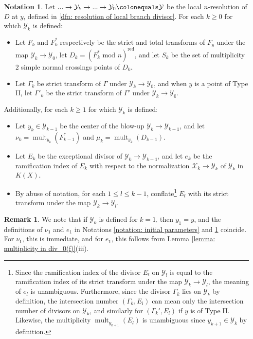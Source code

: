 \documentclass[12pt]{amsart}
\numberwithin{equation}{section}
\theoremstyle{definition}
\newtheorem{remark}[equation]{Remark}
\newtheorem{notation}[equation]{Notation}
\newcommand{\X}{\mathcal{X}}
\newcommand{\Y}{\mathcal{Y}}
\newcommand{\tx}[1]{\text{#1}}
\DeclareMathOperator{\mult}{mult}
\begin{document}
\begin{notation}\label{notation: multiplicity 2 point}
    Let $...\to\Y_k\to...\to\Y_0\colonequals\Y$ be the local $n$-resolution of $D$ at $y$, defined in \ref{dfn: resolution of local branch divisor}. For each $k\geq 0$ for which $\Y_k$ is defined:
    \begin{itemize}
        \item Let $F_k$ and $F_k^*$ respectively be the strict and total transforms of $F_y$ under the map $\Y_k\to\Y_0$, let $D_k=(F_k^*\tx{ mod }n)^\tx{red}$, and let $S_k$ be the set of multiplicity $2$ simple normal crossings points of $D_k$.
        \item Let $\Gamma_k$ be strict transform of $\Gamma$ under $\Y_k\to\Y_0$, and when $y$ is a point of Type II, let $\Gamma'_k$ be the strict transform of $\Gamma'$ under $\Y_k\to\Y_0$.
    \end{itemize}
    Additionally, for each $k\geq 1$ for which $\Y_k$ is defined:
    \begin{itemize}
        \item Let $y_k\in\Y_{k-1}$ be the center of the blow-up $\Y_k\to\Y_{k-1}$, and let $\nu_k=\mult_{y_k}(F^*_{k-1})$ and $\mu_k=\mult_{y_k}(D_{k-1})$.
        \item Let $E_k$ be the exceptional divisor of $\Y_k\to\Y_{k-1}$, and let $e_k$ be the ramification index of $E_k$ with respect to the normalization $\X_k\to\Y_k$ of $\Y_k$ in $K(X)$.
        \item By abuse of notation, for each $1\leq l\leq k-1$, conflate\footnote{Since the ramification index of the divisor $E_l$ on $\Y_l$ is equal to the ramification index of its strict transform under the map $\Y_k\to\Y_l$, the meaning of $e_l$ is unambiguous. Furthermore, since the divisor $\Gamma_k$ lies on $\Y_k$ by definition, the intersection number $(\Gamma_k,E_l)$ can mean only the intersection number of divisors on $\Y_k$, and similarly for $(\Gamma_k',E_l)$ if $y$ is of Type II. Likewise, the multiplicity $\mult_{y_{k+1}}(E_l)$ is unambiguous since $y_{k+1}\in\Y_k$ by definition.}
        $E_l$ with its strict transform under the map $\Y_k\to\Y_l$.
    \end{itemize} 
\end{notation}

\begin{remark}\label{rmk: notation is consistent}
    We note that if $\Y_k$ is defined for $k=1$, then $y_1=y$, and the definitions of $\nu_1$ and $e_1$ in Notations \ref{notation: initial parameters} and \ref{notation: multiplicity 2 point} coincide. For $\nu_1$, this is immediate, and for $e_1$, this follows from Lemma \ref{lemma: multiplicity in div_0(f)}(iii).
\end{remark}
\end{document}
